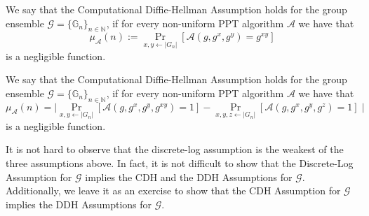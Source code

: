 \begin{definition}\label{def:cdh}
We say that the Computational Diffie-Hellman Assumption holds for the group ensemble $\mathcal{G} =\{ \mathbb{G}_n\}_{n \in \mathbb{N}}$, if for every non-uniform PPT algorithm $\mathcal{A}$ we have that
\[\mu_\mathcal{A}(n) := \Pr_{x,y \leftarrow |G_n|}[\mathcal{A}(g,g^x,g^y) = g^{xy}]\]
is a negligible function.
\end{definition}

\begin{definition}\label{def:ddh}
We say that the Computational Diffie-Hellman Assumption holds for the group ensemble $\mathcal{G} =\{ \mathbb{G}_n\}_{n \in \mathbb{N}}$, if for every non-uniform PPT algorithm $\mathcal{A}$ we have that
\[\mu_\mathcal{A}(n) = \mid\Pr_{x,y \leftarrow |G_n|}[\mathcal{A}(g,g^x,g^y,g^{xy}) = 1] - \Pr_{x,y,z \leftarrow |G_n|}[\mathcal{A}(g,g^x,g^y,g^{z}) = 1]\mid\]
is a negligible function.
\end{definition}

It is not hard to observe that the discrete-log assumption is the weakest of the three assumptions above. In fact, it is not difficult to show that the Discrete-Log Assumption for $\mathcal{G}$ implies the CDH and the DDH Assumptions for $\mathcal{G}$.  Additionally, we leave it as an exercise to show that the CDH Assumption for $\mathcal{G}$ implies the  DDH Assumptions for $\mathcal{G}$.

